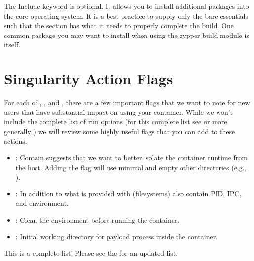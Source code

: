 \documentclass[letterpaper,10pt,english]{sphinxmanual}
\begin{document}
The Include keyword is optional. It allows you to install additional packages into the core operating system.
It is a best practice to supply only the bare essentials such that the  section has what it needs to properly complete the build.
One common package you may want to install when using the zypper build module is  itself.


\section{Singularity Action Flags}
\label{\detokenize{appendix:singularity-action-flags}}\label{\detokenize{appendix:id29}}\label{\detokenize{appendix:sec-action-flags}}
For each of , , and , there are a few important flags that we want to note for new users that have substantial impact on using
your container. While we won’t include the complete list of run options (for this complete list see  or more generally
) we will review some highly useful flags that you can add to these actions.
\begin{itemize}
\item {} 
: Contain suggests that we want to better isolate the container runtime from the host. Adding the  flag will use minimal  and empty other directories (e.g., ).

\item {} 
: In addition to what is provided with  (filesystems) also contain PID, IPC, and environment.

\item {} 
: Clean the environment before running the container.

\item {} 
: Initial working directory for payload process inside the container.

\end{itemize}

This is  a complete list! Please see the  for an updated list.
\end{document}
